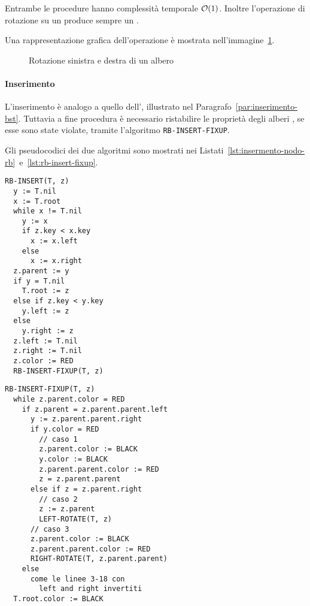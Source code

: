 \documentclass[italian, 10pt]{article}
\begin{document}
\bigskip
Entrambe le procedure hanno complessità temporale \(\mathcal{O}(1)\).
Inoltre l'operazione di rotazione su un \RB produce sempre un \RB.

\bigskip
Una rappresentazione grafica dell'operazione è mostrata nell'immagine~\ref{fig:rotazione-sinistra-destra-rb}.

\begin{figure}[htbp]
  \bigskip
  \centering
  \caption{Rotazione sinistra e destra di un albero \RB}
  \label{fig:rotazione-sinistra-destra-rb}
  \bigskip
\end{figure}

\paragraph{Inserimento}
\label{par:inserimento-rb}

L'inserimento è analogo a quello dell'\BST, illustrato nel Paragrafo~\ref{par:inserimento-bst}.
Tuttavia a fine procedura è necessario ristabilire le proprietà degli alberi \RB, se esse sono state violate, tramite l'algoritmo \texttt{RB-INSERT-FIXUP}.

\bigskip
Gli pseudocodici dei due algoritmi sono mostrati nei Listati~\ref{lst:insermento-nodo-rb}~e~\ref{lst:rb-insert-fixup}.

\begin{minipage}[t]{0.445\textwidth}
  \begin{lstlisting}[style=pseudocode, caption={Inserimento in un RB}, label={lst:insermento-nodo-rb}]
RB-INSERT(T, z)
  y := T.nil
  x := T.root
  while x != T.nil
    y := x
    if z.key < x.key
      x := x.left
    else
      x := x.right
  z.parent := y
  if y = T.nil
    T.root := z
  else if z.key < y.key
    y.left := z
  else
    y.right := z
  z.left := T.nil
  z.right := T.nil
  z.color := RED
  RB-INSERT-FIXUP(T, z)
\end{lstlisting}
\end{minipage}
\begin{minipage}[t]{0.55\textwidth}
  \begin{lstlisting}[style=pseudocode, caption={Fixup dopo inserimento}, label={lst:rb-insert-fixup}]
RB-INSERT-FIXUP(T, z)
  while z.parent.color = RED
    if z.parent = z.parent.parent.left
      y := z.parent.parent.right
      if y.color = RED
        // caso 1
        z.parent.color := BLACK
        y.color := BLACK
        z.parent.parent.color := RED
        z = z.parent.parent
      else if z = z.parent.right
        // caso 2
        z := z.parent
        LEFT-ROTATE(T, z)
      // caso 3
      z.parent.color := BLACK
      z.parent.parent.color := RED
      RIGHT-ROTATE(T, z.parent.parent)
    else
      come le linee 3-18 con
        left and right invertiti
  T.root.color := BLACK
  \end{lstlisting}
\end{minipage}
\end{document}
